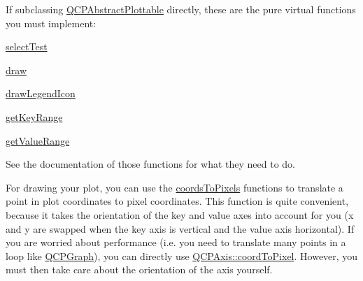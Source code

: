 If subclassing \hyperlink{class_q_c_p_abstract_plottable}{Q\+C\+P\+Abstract\+Plottable} directly, these are the pure virtual functions you must implement\+: \begin{DoxyItemize}
\item \hyperlink{class_q_c_p_abstract_plottable_a38efe9641d972992a3d44204bc80ec1d}{select\+Test} \item \hyperlink{class_q_c_p_abstract_plottable_a453f676a5cee7bf846c5f0fa05ea84b3}{draw} \item \hyperlink{class_q_c_p_abstract_plottable_a9a450783fd9ed539e589999fd390cdf7}{draw\+Legend\+Icon} \item \hyperlink{class_q_c_p_abstract_plottable_a4da16d3cd4b509e1104a9b0275623c96}{get\+Key\+Range} \item \hyperlink{class_q_c_p_abstract_plottable_a4de773988b21ed090fddd27c6a3a3dcb}{get\+Value\+Range}\end{DoxyItemize}
See the documentation of those functions for what they need to do.

For drawing your plot, you can use the \hyperlink{class_q_c_p_abstract_plottable_ade710a776104b14c1c835168ce1bfc5c}{coords\+To\+Pixels} functions to translate a point in plot coordinates to pixel coordinates. This function is quite convenient, because it takes the orientation of the key and value axes into account for you (x and y are swapped when the key axis is vertical and the value axis horizontal). If you are worried about performance (i.\+e. you need to translate many points in a loop like \hyperlink{class_q_c_p_graph}{Q\+C\+P\+Graph}), you can directly use \hyperlink{class_q_c_p_axis_a985ae693b842fb0422b4390fe36d299a}{Q\+C\+P\+Axis\+::coord\+To\+Pixel}. However, you must then take care about the orientation of the axis yourself.

